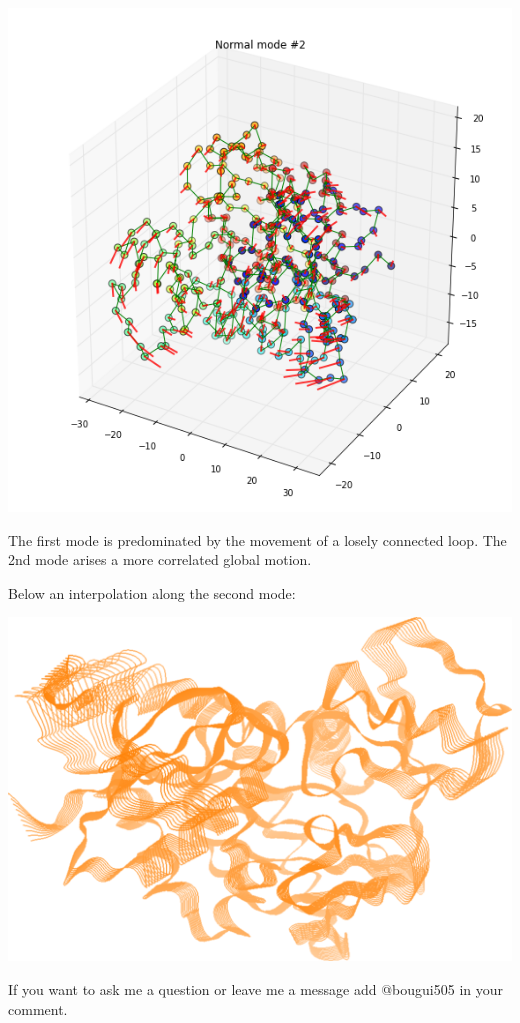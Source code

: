 \documentclass[
]{article}
\begin{document}
\includegraphics{figures/normal_modes_29_1.png}

The first mode is predominated by the movement of a losely connected
loop. The 2nd mode arises a more correlated global motion.

Below an interpolation along the second mode:

\includegraphics{figures/vana_second_mode.png}

{If you want to ask me a question or leave me a message add @bougui505
in your comment.}
\end{document}
